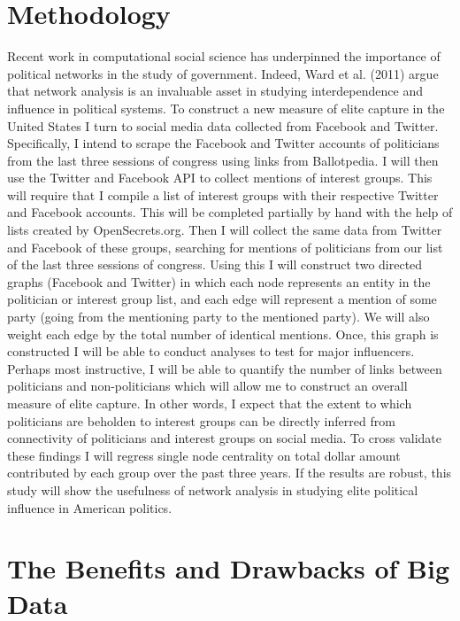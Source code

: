 \documentclass[dvips,12pt]{article}
\begin{document}
\section{Methodology}

Recent work in computational social science has underpinned the importance of political networks in the study of government.\cite{RefWorks:doc:59e293d5e4b0ff0c7c11a827}  Indeed, Ward et al. (2011) argue that network analysis is an invaluable asset in studying interdependence and influence in political systems.\cite{RefWorks:doc:59e2942de4b030e7c2c3cf11}  To construct a new measure of elite capture in the United States I turn to social media data collected from Facebook and Twitter. Specifically, I intend to scrape the Facebook and Twitter accounts of politicians from the last three sessions of congress using links from Ballotpedia.  I will then use the Twitter and Facebook API to collect mentions of interest groups. This will require that I compile a list of interest groups with their respective Twitter and Facebook accounts. This will be completed partially by hand with the help of lists created by OpenSecrets.org.  Then I will collect the same data from Twitter and Facebook of these groups, searching for mentions of politicians from our list of the last three sessions of congress. Using this I will construct two directed graphs (Facebook and Twitter) in which each node represents an entity in the politician or interest group list, and each edge will represent a mention of some party (going from the mentioning party to the mentioned party). We will also weight each edge by the total number of identical mentions. Once, this graph is constructed I will be able to conduct analyses to test for major influencers. Perhaps most instructive, I will be able to quantify the number of links between politicians and non-politicians which will allow me to construct an overall measure of elite capture. In other words, I expect that the extent to which politicians are beholden to interest groups can be directly inferred from connectivity of politicians and interest groups on social media. To cross validate these findings I will regress single node centrality on total dollar amount contributed by each group over the past three years.\cite{RefWorks:doc:59e29490e4b0b4635e033b3b}  If the results are robust, this study will show the usefulness of network analysis in studying elite political influence in American politics. 

\section{The Benefits and Drawbacks of Big Data}
\end{document}
